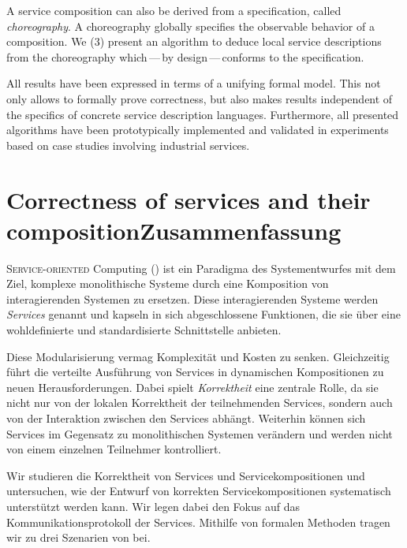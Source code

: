 A service composition can also be derived from a specification, called \emph{choreography}. A choreography globally specifies the observable behavior of a composition. We (3) present an algorithm to deduce local service descriptions from the choreography which\,---\,by design\,---\,conforms to the specification.

All results have been expressed in terms of a unifying formal model. This not only allows to formally prove correctness, but also makes results independent of the specifics of concrete service description languages. Furthermore, all presented algorithms have been prototypically implemented and validated in experiments based on case studies involving industrial services.





\newpage




\chapter*{Correctness of services and their composition\vspace{0.1em}\newline Zusammenfassung}

\lettrine[findent=.1em,lines=2,nindent=0em]{S}{ervice-oriented} Computing () ist ein Paradigma des Systementwurfes mit dem Ziel, komplexe monolithische Systeme durch eine Komposition von interagierenden Systemen zu ersetzen. Diese interagierenden Systeme werden \emph{Services} genannt und kapseln in sich abgeschlossene Funktionen, die sie \"uber eine wohldefinierte und standardisierte Schnittstelle anbieten.

Diese Modularisierung vermag Komplexit\"at und Kosten zu senken. Gleichzeitig f\"uhrt die verteilte Ausf\"uhrung von Services in dynamischen Kompositionen zu neuen Herausforderungen. Dabei spielt \emph{Korrektheit} eine zentrale Rolle, da sie nicht nur von der lokalen Korrektheit der teilnehmenden Services, sondern auch von der Interaktion zwischen den Services abh\"angt. Weiterhin k\"onnen sich Services im Gegensatz zu monolithischen Systemen ver\"andern und werden nicht von einem einzelnen Teilnehmer kontrolliert.

Wir studieren die Korrektheit von Services und Servicekompositionen und untersuchen, wie der Entwurf von korrekten Servicekompositionen systematisch unterst\"utzt werden kann. Wir legen dabei den Fokus auf das Kommunikationsprotokoll der Services. Mithilfe von formalen Methoden tragen wir zu drei Szenarien von  bei.

